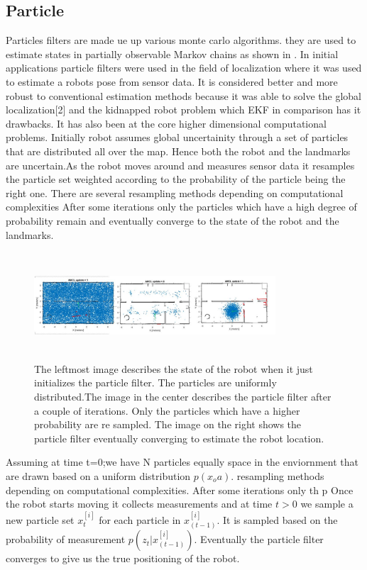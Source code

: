 \documentclass[conference]{IEEEtran}
\begin{document}
\subsection{Particle}      %
Particles filters are made ue up various monte carlo algorithms. they are used to estimate states in partially observable Markov chains as shown in \cite{Doucet2001}. In  initial applications particle filters were used in the field of localization where it was used to estimate a robots pose from sensor data. It is considered better and more robust to conventional estimation methods because it was able to solve the global localization[2] and the kidnapped robot problem\cite{Engelson1992} which EKF in comparison has it drawbacks. It has also been at the core higher dimensional computational problems.  
Initially robot assumes global uncertainity through a set of particles that are distributed all over the map. Hence both the robot and the landmarks are uncertain.As the robot moves around and measures sensor data it resamples the particle set weighted according to the probability of the particle being the right one. There are several resampling methods depending on computational complexities \cite{Li2015} After some iterations only the particles which have a high degree of probability  remain and eventually converge to the state of the robot and the landmarks.
\begin{figure}[h!]
	\centering
	\includegraphics[height=40mm,width=90mm]{Particle_filter_method.JPG}
	\caption{The leftmost image describes the state of the robot when it just initializes the particle filter. The particles are uniformly distributed.The image in the center describes the particle filter after a couple of iterations. Only the particles which have a higher probability are re sampled. The image on the right shows the particle filter eventually converging to estimate the robot location. }
	
\end{figure}
Assuming at time t=0;we have N particles equally space in the enviornment that are drawn based on a uniform distribution $ p(x_oa)$.                                                                        resampling methods depending on computational complexities. After some iterations only th   p
Once the robot starts moving it collects measurements and at time $t>0$ we sample a new particle set $x^{[i]}_t$ for each particle in $x^{[i]}_{(t-1)}$. It is sampled based on the probability of measurement $p(z_t|x^{[i]}_{(t-1)})$. Eventually the particle filter converges to give us the true positioning of the robot.
\end{document}
